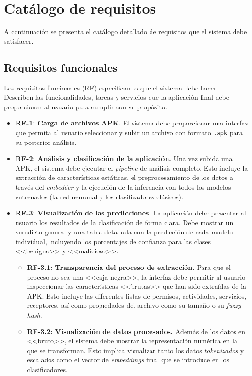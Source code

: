 \section{Catálogo de requisitos}
A continuación se presenta el catálogo detallado de requisitos que el sistema debe satisfacer.

\subsection{Requisitos funcionales}
Los requisitos funcionales (RF) especifican lo que el sistema debe hacer. Describen las funcionalidades, tareas y servicios que la aplicación final debe proporcionar al usuario para cumplir con su propósito.

\begin{itemize}
	\item \textbf{RF-1: Carga de archivos APK.} El sistema debe proporcionar una interfaz que permita al usuario seleccionar y subir un archivo con formato \texttt{.apk} para su posterior análisis.
	
	\item \textbf{RF-2: Análisis y clasificación de la aplicación.} Una vez subida una APK, el sistema debe ejecutar el \textit{pipeline} de análisis completo. Esto incluye la extracción de características estáticas, el preprocesamiento de los datos a través del \textit{embedder} y la ejecución de la inferencia con todos los modelos entrenados (la red neuronal y los clasificadores clásicos).
	
	\item \textbf{RF-3: Visualización de las predicciones.} La aplicación debe presentar al usuario los resultados de la clasificación de forma clara. Debe mostrar un veredicto general y una tabla detallada con la predicción de cada modelo individual, incluyendo los porcentajes de confianza para las clases <<benigno>> y <<malicioso>>.
	
	\begin{itemize}
		\item \textbf{RF-3.1: Transparencia del proceso de extracción.} Para que el proceso no sea una <<caja negra>>, la interfaz debe permitir al usuario inspeccionar las características <<brutas>> que han sido extraídas de la APK. Esto incluye las diferentes listas de permisos, actividades, servicios, receptores, así como propiedades del archivo como su tamaño o su \textit{fuzzy hash}.
		
		\item \textbf{RF-3.2: Visualización de datos procesados.} Además de los datos en <<bruto>>, el sistema debe mostrar la representación numérica en la que se transforman. Esto implica visualizar tanto los datos \textit{tokenizados} y escalados como el vector de \textit{embeddings} final que se introduce en los clasificadores.
	\end{itemize}
	

\end{itemize}
